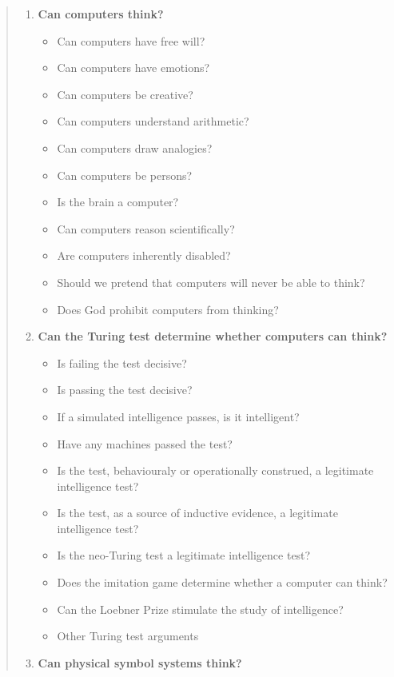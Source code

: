 \documentclass[11pt]{thesis} %
\begin{document}
\begin{quotation}
  \begin{enumerate}
    \item \textbf{Can computers think?}
      \begin{itemize}
        \item Can computers have free will?
        \item Can computers have emotions?
        \item Can computers be creative?
        \item Can computers understand arithmetic?
        \item Can computers draw analogies?
        \item Can computers be persons?
        \item Is the brain a computer?
        \item Can computers reason scientifically?
        \item Are computers inherently disabled?
        \item Should we pretend that computers will never be able to think?
        \item Does God prohibit computers from thinking?
      \end{itemize}
    \item \textbf{Can the Turing test determine whether computers can think?}
      \begin{itemize}
        \item Is failing the test decisive?
        \item Is passing the test decisive?
        \item If a simulated intelligence passes, is it intelligent?
        \item Have any machines passed the test?
        \item Is the test, behaviouraly or operationally construed, a legitimate intelligence test?
        \item Is the test, as a source of inductive evidence, a legitimate intelligence test?
        \item Is the neo-Turing test a legitimate intelligence test?
        \item Does the imitation game determine whether a computer can think?
        \item Can the Loebner Prize stimulate the study of intelligence?
        \item Other Turing test arguments
      \end{itemize}
    \item \textbf{Can physical symbol systems think?}

\end{enumerate}
\end{quotation}
\end{document}
